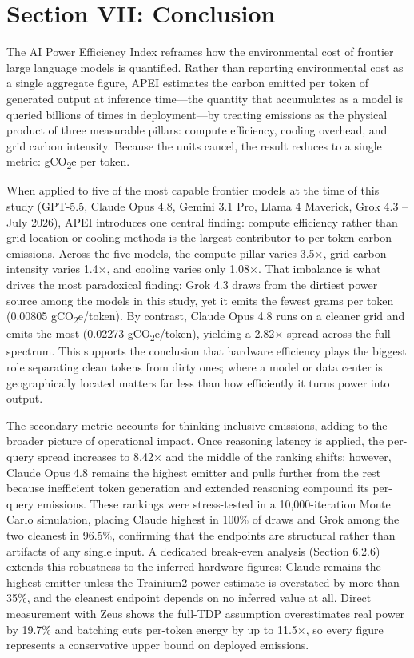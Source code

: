 \documentclass[11pt]{article}
\newcommand{\cotwo}{CO\textsubscript{2}}     %
\begin{document}
\section*{Section VII: Conclusion}

The AI Power Efficiency Index reframes how the environmental cost of frontier large language models is quantified. Rather than reporting environmental cost as a single aggregate figure, APEI estimates the carbon emitted per token of generated output at inference time---the quantity that accumulates as a model is queried billions of times in deployment---by treating emissions as the physical product of three measurable pillars: compute efficiency, cooling overhead, and grid carbon intensity. Because the units cancel, the result reduces to a single metric: g\cotwo e per token.

When applied to five of the most capable frontier models at the time of this study (GPT-5.5, Claude Opus 4.8, Gemini 3.1 Pro, Llama 4 Maverick, Grok 4.3 -- July 2026), APEI introduces one central finding: compute efficiency rather than grid location or cooling methods is the largest contributor to per-token carbon emissions. Across the five models, the compute pillar varies 3.5$\times$, grid carbon intensity varies 1.4$\times$, and cooling varies only 1.08$\times$. That imbalance is what drives the most paradoxical finding: Grok 4.3 draws from the dirtiest power source among the models in this study, yet it emits the fewest grams per token (0.00805 g\cotwo e/token). By contrast, Claude Opus 4.8 runs on a cleaner grid and emits the most (0.02273 g\cotwo e/token), yielding a 2.82$\times$ spread across the full spectrum. This supports the conclusion that hardware efficiency plays the biggest role separating clean tokens from dirty ones; where a model or data center is geographically located matters far less than how efficiently it turns power into output.

The secondary metric accounts for thinking-inclusive emissions, adding to the broader picture of operational impact. Once reasoning latency is applied, the per-query spread increases to 8.42$\times$ and the middle of the ranking shifts; however, Claude Opus 4.8 remains the highest emitter and pulls further from the rest because inefficient token generation and extended reasoning compound its per-query emissions. These rankings were stress-tested in a 10,000-iteration Monte Carlo simulation, placing Claude highest in 100\% of draws and Grok among the two cleanest in 96.5\%, confirming that the endpoints are structural rather than artifacts of any single input. A dedicated break-even analysis (Section 6.2.6) extends this robustness to the inferred hardware figures: Claude remains the highest emitter unless the Trainium2 power estimate is overstated by more than 35\%, and the cleanest endpoint depends on no inferred value at all. Direct measurement with Zeus shows the full-TDP assumption overestimates real power by 19.7\% and batching cuts per-token energy by up to 11.5$\times$, so every figure represents a conservative upper bound on deployed emissions.
\end{document}
